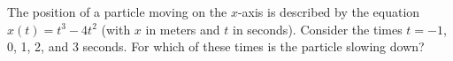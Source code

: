 %
The position of a particle moving on the $x$-axis is described by the
equation $x(t) = t^3 - 4t^2$ (with $x$ in meters and $t$ in seconds).
Consider the times $t = -1$, 0, 1, 2, and 3 seconds. For which of
these times is the particle slowing down?
